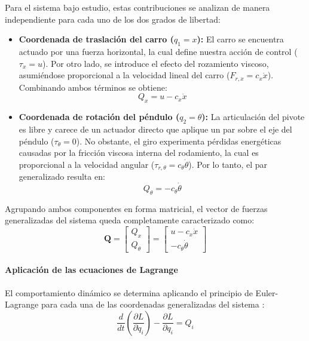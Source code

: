\documentclass[11pt,fleqn]{book} %
\begin{document}
Para el sistema bajo estudio, estas contribuciones se analizan de manera independiente para cada uno de los dos grados de libertad:
\begin{itemize}
	\item \textbf{Coordenada de traslación del carro ($q_1 = x$):} 
	El carro se encuentra actuado por una fuerza horizontal, la cual define nuestra acción de control ($\tau_x = u$). Por otro lado, se introduce el efecto del rozamiento viscoso, asumiéndose proporcional a la velocidad lineal del carro ($F_{r,x} = c_x \dot{x}$). Combinando ambos términos se obtiene:
	\begin{equation}
		Q_x = u - c_x \dot{x}
	\end{equation}
	
	\item \textbf{Coordenada de rotación del péndulo ($q_2 = \theta$):} 
	La articulación del pivote es libre y carece de un actuador directo que aplique un par sobre el eje del péndulo ($\tau_\theta = 0$). No obstante, el giro experimenta pérdidas energéticas causadas por la fricción viscosa interna del rodamiento, la cual es proporcional a la velocidad angular ($\tau_{r,\theta} = c_\theta \dot{\theta}$). Por lo tanto, el par generalizado resulta en:
	\begin{equation}
		Q_\theta = -c_\theta \dot{\theta}
	\end{equation}
\end{itemize}

Agrupando ambos componentes en forma matricial, el vector de fuerzas generalizadas del sistema queda completamente caracterizado como:
\begin{equation}
	\mathbf{Q} = \begin{bmatrix} Q_x \\ Q_\theta \end{bmatrix} = \begin{bmatrix} u - c_x \dot{x} \\ -c_\theta \dot{\theta} \end{bmatrix}
\end{equation}

\paragraph{Aplicación de las ecuaciones de Lagrange}
El comportamiento dinámico se determina aplicando el principio de Euler-Lagrange para cada una de las coordenadas generalizadas del sistema \cite{Penarrocha_Tema6}:
\begin{equation}
	\frac{d}{dt}\left(\frac{\partial L}{\partial \dot{q}_i}\right) - \frac{\partial L}{\partial q_i} = Q_i
	\label{lagrange0}
\end{equation}
\end{document}
